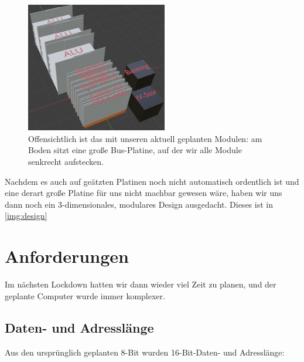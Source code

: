 \documentclass{scrartcl}
\begin{document}
        \begin{figure}
        \vspace{-40pt}
        \begin{center}
        \includegraphics[width=0.55\textwidth]{3D_Desighn_V21}
        \end{center}
        \caption{Offensichtlich ist das mit unseren aktuell geplanten Modulen: am Boden sitzt eine große Bus-Platine, auf der wir alle Module senkrecht aufstecken.\label{img:design}}
        \vspace{-160pt}
        \end{figure}

    Nachdem es auch auf geätzten Platinen noch nicht automatisch ordentlich ist und eine derart große Platine für uns nicht machbar gewesen wäre, haben wir uns dann noch ein 3-dimensionales, modulares Design ausgedacht. Dieses ist in \autoref{img:design}



    \newpage
    \section{Anforderungen}
    \vspace{-15pt}
    Im nächsten Lockdown hatten wir dann wieder viel Zeit zu planen, und der geplante Computer wurde immer komplexer.

    \subsection{Daten- und Adresslänge}
    \vspace{-15pt}

    Aus den ursprünglich geplanten 8-Bit wurden 16-Bit-Daten- und Adresslänge:
\end{document}

